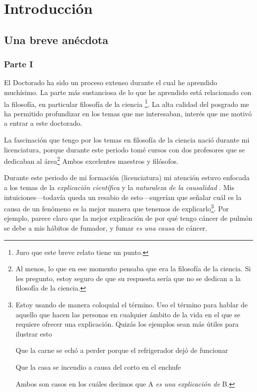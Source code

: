 
\chapter*{ Introducción }\label{ ch:introduction }

\section*{ Una breve anécdota }

\subsection{ Parte I }

\noindent El Doctorado ha sido un proceso extenso
durante el cual he aprendido muchísimo. La parte más
sustanciosa de lo que he aprendido está relacionado
con la filosofía, en particular filosofía de la ciencia
\footnote{
	Juro que este breve relato tiene un punto.
}.
La alta calidad del posgrado me ha permitido
profundizar en los temas que me interesaban, interés
que me motivó a entrar a este doctorado.

La fascinación que tengo por los temas en filosofía de
la ciencia nació durante mi licenciatura, porque
durante este periodo tomé cursos con dos profesores
que se dedicaban al área\footnote{
	Al menos, lo que en ese momento pensaba que era la
	filosofía de la	ciencia. Si les pregunto, estoy
	seguro de que su respuesta sería que no se dedican
	a la filosofía de la ciencia.
}
Ambos excelentes maestros y filósofos.

Durante este periodo de mi formación (licenciatura) mi
atención estuvo enfocada a los temas de la \emph
{ explicación científica } y la \emph{ naturaleza de
la causalidad }. Mis intuiciones---todavía queda un
resabio de esto---sugerían que señalar cuál es la
causa de un fenómeno es la mejor manera que tenemos de
explicarlo\footnote{
	Estoy usando de manera coloquial el término. Uso
	el término para hablar de aquello que hacen las
	personas en cualquier ámbito de la vida en el que
	se requiere ofrecer una explicación. Quizás los ejemplos sean más útiles para ilustrar esto
	\begin{ itemize }

	    \item Que la carne se echó a perder porque el
		refrigerador dejó de funcionar

		\item Que la casa se incendio a causa del
		corto en el enchufe

	\end{ itemize }

	Ambos son casos en los cuáles decimos que A \emph{
	es una explicación de } B.
}.
Por ejemplo, parece claro que la mejor explicación de
por qué tengo cáncer de pulmón se debe a mis hábitos
de fumador, y fumar \emph{ es una causa } de cáncer.

